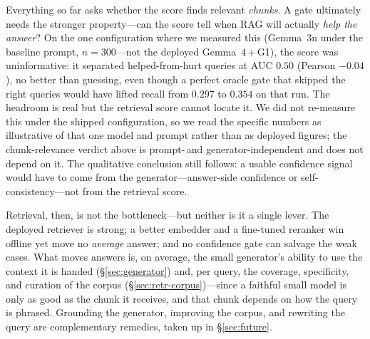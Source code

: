 Everything so far asks whether the score finds relevant \emph{chunks}. A gate
ultimately needs the stronger property---can the score tell when RAG will
actually \emph{help the answer}? On the one configuration where we measured
this (Gemma~3n under the baseline prompt, $n=300$---not the deployed
Gemma~4\,+\,G1), the score was uninformative: it separated helped-from-hurt
queries at AUC $0.50$ (Pearson $-0.04$), no better than guessing, even though a
perfect oracle gate that skipped the right queries would have lifted recall from
$0.297$ to $0.354$ on that run. The headroom is real but the retrieval score
cannot locate it. We did not re-measure this under the shipped configuration, so
we read the specific numbers as illustrative of that one model and prompt rather
than as deployed figures; the chunk-relevance verdict above is
prompt-\,and generator-independent and does not depend on it. The qualitative
conclusion still follows: a usable confidence signal would have to come from the
generator---answer-side confidence or self-consistency---not from the retrieval
score.

\medskip
Retrieval, then, is not the bottleneck---but neither is it a single lever. The
deployed retriever is strong; a better embedder and a fine-tuned reranker win
offline yet move no \emph{average} answer; and no confidence gate can salvage
the weak cases. What moves answers is, on average, the small generator's
ability to use the context it is handed (\S\ref{sec:generator}) and, per query,
the coverage, specificity, and curation of the corpus
(\S\ref{sec:retr-corpus})---since a faithful small model is only as good as the
chunk it receives, and that chunk depends on how the query is phrased.
Grounding the generator, improving the corpus, and rewriting the query are
complementary remedies, taken up in \S\ref{sec:future}.
